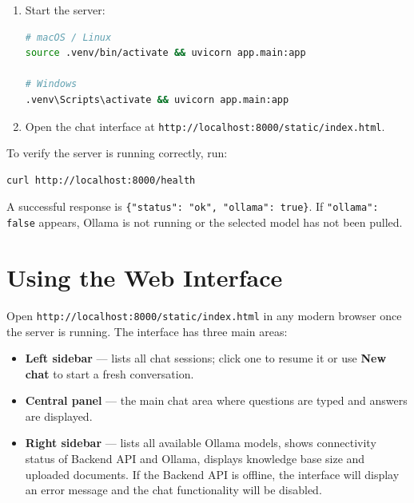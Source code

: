 \begin{enumerate}
\begin{lstlisting}
To start the server:
  source .venv/bin/activate && uvicorn app.main:app  (macOS/Linux)
  .venv\Scripts\activate && uvicorn app.main:app     (Windows)

Then open: http://localhost:8000/static/index.html
\end{lstlisting}

          On subsequent runs the crawler skips already-downloaded files and the
          embedding step skips unchanged chunks, so re-running setup is fast
          and safe.

    \item Start the server:
\begin{lstlisting}[language=bash]
# macOS / Linux
source .venv/bin/activate && uvicorn app.main:app

# Windows
.venv\Scripts\activate && uvicorn app.main:app
\end{lstlisting}

    \item Open the chat interface at
          \texttt{http://localhost:8000/static/index.html}.
\end{enumerate}

To verify the server is running correctly, run:

\begin{lstlisting}[language=bash]
curl http://localhost:8000/health
\end{lstlisting}

A successful response is \texttt{\{"status": "ok", "ollama": true\}}. If
\texttt{"ollama": false} appears, Ollama is not running or the selected model
has not been pulled.

\section{Using the Web Interface}
\label{sec:user-web}

Open \texttt{http://localhost:8000/static/index.html} in any modern browser
once the server is running. The interface has three main areas:

\begin{itemize}
    \item \textbf{Left sidebar} --- lists all chat sessions; click one to
          resume it or use \textbf{New chat} to start a fresh conversation.
    \item \textbf{Central panel} --- the main chat area where questions are
          typed and answers are displayed.
    \item \textbf{Right sidebar} --- lists all available Ollama models, shows connectivity status of Backend API and Ollama, displays knowledge base size and uploaded documents.
          If the Backend API is offline, the interface will display an error message and the chat functionality will be disabled.
\end{itemize}

